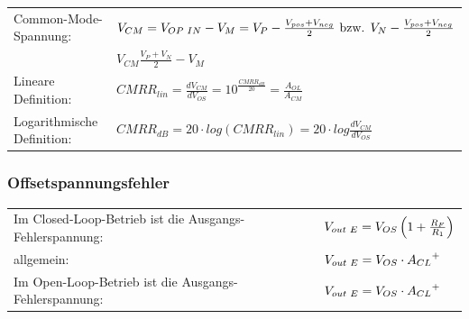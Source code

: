 				\begin{tabular}{ll}
        	Common-Mode-Spannung: &
          $V_{CM}=V_{OP \hspace{1mm} IN}-V_M=V_P- \frac{V_{pos}+V_{neg}}{2} \mbox{ bzw. }V_N- \frac{V_{pos}+V_{neg}}{2}$\\
          & $V_{CM}\frac{V_{P}+V_{N}}{2}-V_M$ \\
          Lineare Definition: &
          $CMRR_{lin}=\frac{dV_{CM}}{dV_{OS}}=10^{\frac{CMRR_{dB}}{20}}=\frac{A_{OL}}{A_{CM}}$\\
          Logarithmische Definition: &
          $CMRR_{dB}=20 \cdot log(CMRR_{lin})=20 \cdot
          log\frac{dV_{CM}}{dV_{OS}}$\\
				\end{tabular}
		
		\subsubsection{Offsetspannungsfehler }
				\begin{tabular}{ll}
					Im Closed-Loop-Betrieb ist die Ausgangs-Fehlerspannung: &
					$V_{out \hspace{1mm}E}=V_{OS}\left( 1+\frac{R_F}{R_1}\right)$\\
          allgemein: &
          $V_{out \hspace{1mm}E}=V_{OS} \cdot {A_{CL}}^{+}$\\
          Im Open-Loop-Betrieb ist die Ausgangs-Fehlerspannung: &
          $V_{out \hspace{1mm}E}=V_{OS}\cdot {A_{CL}}^{+}$\\
         \end{tabular}
		
